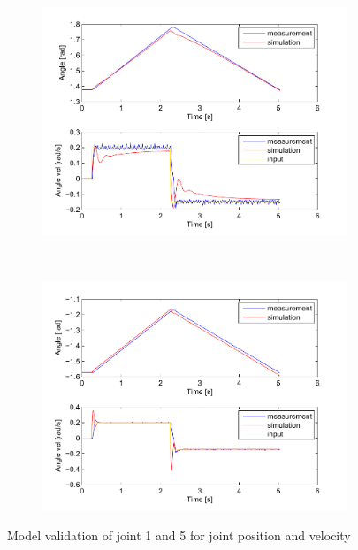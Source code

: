 \begin{figure}
	\centering
	\begin{subfigure}[b]{0.5\textwidth}
		\includegraphics[width=1\linewidth]{Joint5.pdf}
		\caption{}
		\label{fig:Joint5}
	\end{subfigure}%
	~ %
	\begin{subfigure}[b]{0.5\textwidth}
		\includegraphics[width=1\linewidth]{Joint1.pdf}
		\caption{}
		\label{fig:Joint1}
	\end{subfigure}
	\caption{Model validation of joint 1 and 5 for joint position and velocity}\label{fig:idenJoint}
\end{figure}

